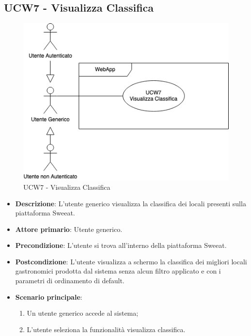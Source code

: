 \subsection{UCW7 - Visualizza Classifica}
\begin{figure}[!h]
\centering
\includegraphics[scale=0.5]{UC_images/UCW7.png}
\caption{UCW7 - Visualizza Classifica}
\end{figure}
\begin{center}
\end{center}
\begin{itemize}
	\item \textbf{Descrizione}: L'utente generico visualizza la classifica dei locali presenti sulla piattaforma Sweeat.
    \item \textbf{Attore primario}: Utente generico.
    \item \textbf{Precondizione}: L’utente si trova all’interno della piattaforma Sweeat.
    \item \textbf{Postcondizione}: L’utente visualizza a schermo la classifica dei migliori locali gastronomici prodotta dal sistema senza alcun filtro applicato e con i parametri di ordinamento di default.
    \item \textbf{Scenario principale}: 
    \begin{enumerate}
        \item Un utente generico accede al sistema;
        \item L’utente seleziona la funzionalità visualizza classifica.
    \end{enumerate}
\end{itemize}

